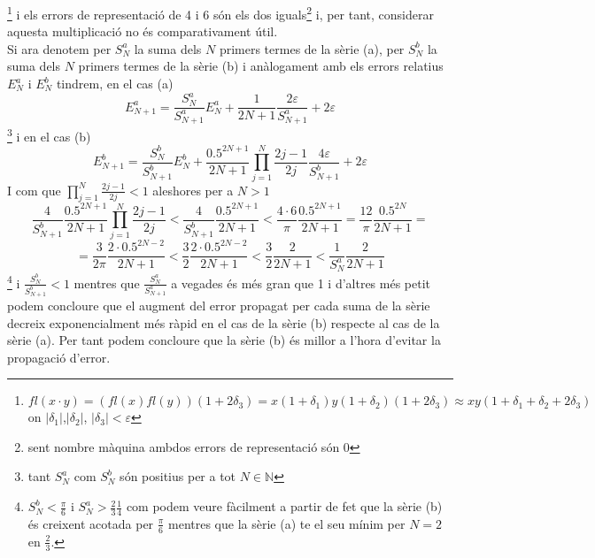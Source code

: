 \documentclass[a4paper,10pt]{article}
\renewcommand{\*}{\cdot}
\renewcommand{\epsilon}{\varepsilon}
\begin{document}
\footnote{$fl(x\*y)=(fl(x)fl(y))(1+2\delta_3)=x(1+\delta_1)y(1+\delta_2)(1+2\delta_3)\approx xy(1+\delta_1+\delta_2+2\delta_3)$ on $|\delta_1|$,$|\delta_2|$,
$|\delta_3|<\epsilon$} i els errors de representació de 4 i 6 són els dos iguals\footnote{sent nombre màquina ambdos errors de representació són 0} i, per tant, considerar
aquesta multiplicació no és comparativament útil.\\
Si ara denotem per $S_N^a$ la suma dels $N$ primers termes de la sèrie (a), per $S_N^b$ la suma dels $N$ primers termes de la sèrie (b) i anàlogament
amb els errors relatius $E_N^a$ i $E_N^b$ tindrem, en el cas (a)
\begin{equation*}
 E_{N+1}^a=\frac{S_N^a}{S_{N+1}^a}E_N^a+\frac{1}{2N+1}\frac{2\epsilon}{S^a_{N+1}}+2\epsilon
\end{equation*}\footnote{tant $S^a_N$ com $S^b_N$ són positius per a tot $N\in\mathbb{N}$}
i en el cas (b)
\begin{equation*}
 E_{N+1}^b=\frac{S_N^b}{S_{N+1}^b}E_N^b+\frac{0.5^{2N+1}}{2N+1}
 \prod_{j=1}^N\frac{2j-1}{2j}\frac{4\epsilon}{S^b_{N+1}}+2\epsilon
\end{equation*}
I com que $\prod_{j=1}^N\frac{2j-1}{2j}<1$ aleshores per a $N>1$
$$\frac{4}{S^b_{N+1}}\frac{0.5^{2N+1}}{2N+1}\prod_{j=1}^N\frac{2j-1}{2j}<
\frac{4}{S^b_{N+1}}\frac{0.5^{2N+1}}{2N+1}<\frac{4\*6}{\pi}\frac{0.5^{2N+1}}{2N+1}=\frac{12}{\pi}\frac{0.5^{2N}}{2N+1}=$$
$$=\frac{3}{2\pi}\frac{2\*0.5^{2N-2}}{2N+1}<
\frac{3}{2}\frac{2\*0.5^{2N-2}}{2N+1}<\frac{3}{2}\frac{2}{2N+1}<\frac{1}{S_N^a}\frac{2}{2N+1}$$\footnote{$S_N^b<\frac{\pi}{6}$ i $S_N^a>\frac{2}{3}\frac{1}{4}$ com podem veure fàcilment a partir de fet que la sèrie (b) és creixent
acotada per $\frac{\pi}{6}$ mentres que la sèrie (a) te el seu mínim per $N=2$ en $\frac{2}{3}$.} i $\frac{S^b_N}{S^b_{N+1}}<1$ mentres que $\frac{S^a_N}{S^a_{N+1}}$ a vegades és més gran que 1
i d'altres més petit podem concloure que el augment del error propagat per cada suma de la sèrie decreix exponencialment més ràpid en el cas de la sèrie (b) respecte al
cas de la sèrie (a). Per tant podem concloure que la sèrie (b) és millor a l'hora d'evitar la propagació d'error.
\end{document}
